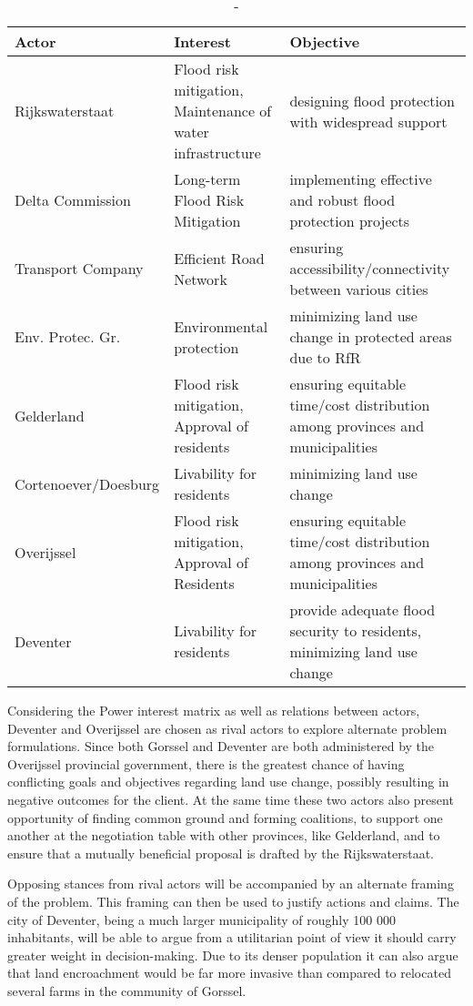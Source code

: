 \begin{table}[h!]
\begin{tabular}{p{}p{}p{}}
\hline 
Actor & Interest & Objective \\ \hline
Rijkswaterstaat         & Flood risk mitigation, Maintenance of water infrastructure & designing flood protection with widespread support \\ 
Delta Commission        & Long-term Flood Risk Mitigation & implementing effective and robust flood protection projects \\
Transport Company       & Efficient Road Network & ensuring accessibility/connectivity between various cities \\
Env. Protec. Gr.        & Environmental protection & minimizing land use change in protected areas due to RfR \\
Gelderland              & Flood risk mitigation, Approval of residents & ensuring equitable time/cost distribution among provinces and municipalities \\
Cortenoever/Doesburg    & Livability for residents & minimizing land use change \\
Overijssel              & Flood risk mitigation, Approval of Residents & ensuring equitable time/cost distribution among provinces and municipalities \\
Deventer                & Livability for residents & provide adequate flood security to residents, minimizing land use change \\

\end{tabular}
\caption{-}
\label{t:actortable}
\end{table}
Considering the Power interest matrix as well as relations between actors, Deventer and Overijssel are chosen as rival actors to explore alternate problem formulations. Since both Gorssel and Deventer are both administered by the Overijssel provincial government, there is the greatest chance of having conflicting goals and objectives regarding land use change, possibly resulting in negative outcomes for the client. At the same time these two actors also present opportunity of finding common ground and forming coalitions, to support one another at the negotiation table with other provinces, like Gelderland, and to ensure that a mutually beneficial proposal is drafted by the Rijkswaterstaat.

Opposing stances from rival actors will be accompanied by an alternate framing of the problem. This framing can then be used to justify actions and claims. The city of Deventer, being a much larger municipality of roughly 100 000 inhabitants, will be able to argue from a utilitarian point of view it should carry greater weight in decision-making. Due to its denser population it can also argue that land encroachment would be far more invasive than compared to relocated several farms in the community of Gorssel. 


